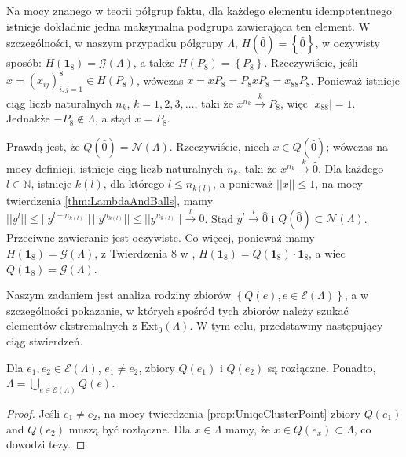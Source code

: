 {\begin{Remark}
\label{rem:GOfLambda}
Na mocy znanego w teorii półgrup faktu, dla każdego elementu idempotentnego
istnieje dokładnie jedna maksymalna podgrupa zawierająca ten element.
W szczególności, w naszym przypadku półgrupy $\Lambda$,
$H(\hat{0}) = \left \{ \hat{0} \right \}$,
w oczywisty sposób:
$H(\mathbf{1}_{8}) = \mathcal{G}(\Lambda)$,
a także $H(P_{8}) = \left \{ P_{8} \right \}$.
Rzeczywiście,
jeśli $x = (x_{ij})_{i,j=1}^{8} \in H(P_{8})$,
wówczas
$x = x P_{8} = P_{8} x P_{8} = x_{88} P_{8}$.
Ponieważ istnieje ciąg liczb naturalnych  $n_{k}$, $k=1,2,3,\ldots$,
taki że $x^{n_{k}} \overset{k}{\rightarrow} P_{8}$,
więc
$|x_{88}| = 1$. Jednakże $- P_{8} \notin \Lambda$,
a stąd $x = P_{8}$.
\end{Remark}

\begin{Remark}
    \label{rem:Qof1}
Prawdą jest, że $Q(\hat{0}) = \mathcal{N}(\Lambda)$.
Rzeczywiście, niech $x \in Q(\hat{0})$;
wówczas na mocy definicji,
istnieje ciąg liczb naturalnych $n_{k}$, taki że
$x^{n_{k}} \overset{k}{\rightarrow} \hat{0}$.
Dla każdego $l \in \mathbb{N}$, istnieje $k(l)$, dla którego
$l \leq n_{k(l)}$, a ponieważ
$||x|| \leq 1 $, na mocy twierdzenia \ref{thm:LambdaAndBalls}, mamy
$||y^{l}|| \leq ||y^{l - n_{k(l)}}|| \, ||y^{n_{k(l)}}|| \leq ||y^{n_{k(l)}}||
\overset{l}{\rightarrow} 0$.
Stąd $y^{l} \overset{l}{\rightarrow} \hat{0}$
i $Q(\hat{0}) \subset \mathcal{N}(\Lambda)$.
Przeciwne zawieranie jest oczywiste.
Co więcej, ponieważ mamy $H(\mathbf{1}_{8}) = \mathcal{G}(\Lambda)$,
    z Twierdzenia 8 w \cite{schwarz1955hausdorff},
    $H(\mathbf{1}_{8}) = Q(\mathbf{1}_{8}) \cdot \mathbf{1}_{8}$,
    a wiec $Q(\mathbf{1}_{8}) = \mathcal{G}(\Lambda)$.
\end{Remark}

Naszym zadaniem jest analiza rodziny zbiorów
$\left \{ Q(e), e \in \mathcal{E}(\Lambda) \right \}$,
a w szczególności pokazanie, w których spośród tych zbiorów należy szukać
elementów ekstremalnych z
$\text{Ext}_{0}(\Lambda)$.
W tym celu, przedstawmy następujący ciąg stwierdzeń.

\begin{Theorem}
    Dla $e_{1}, e_{2} \in \mathcal{E}(\Lambda)$,
    $e_{1} \neq e_{2}$,
    zbiory $Q(e_{1})$ i $Q(e_{2})$ są rozłączne.
Ponadto,
    $\Lambda = \! \bigcup \limits_{e \in \mathcal{E}(\Lambda)} \! Q(e)$.
\end{Theorem}
\begin{proof}
Jeśli $e_{1} \neq e_{2}$, na mocy twierdzenia \ref{prop:UniqeClusterPoint}
zbiory $Q(e_{1})$ and $Q(e_{2})$ muszą być rozłączne.
Dla $x \in \Lambda$ mamy, że $x \in Q(e_{x}) \subset \Lambda$,
co dowodzi tezy.
\end{proof}

}
